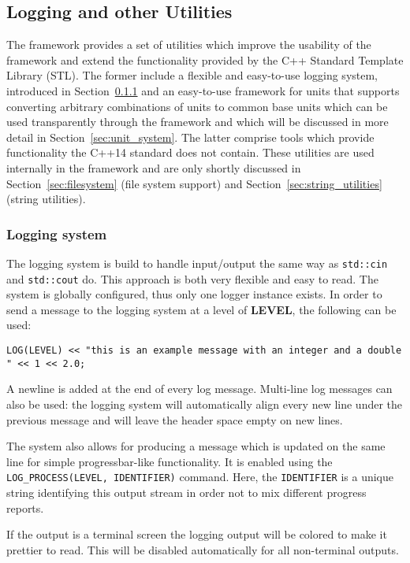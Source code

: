 \subsection{Logging and other Utilities}
\label{sec:logging_utilities}
The \apsq framework provides a set of utilities which improve the usability of the framework and extend the functionality provided by the C++ Standard Template Library (STL).
The former include a flexible and easy-to-use logging system, introduced in Section~\ref{sec:logger} and an easy-to-use framework for units that supports converting arbitrary combinations of units to common base units which can  be used transparently through the framework and which will be discussed in more detail in Section~\ref{sec:unit_system}.
The latter comprise tools which provide functionality the C++14 standard does not contain.
These utilities are used internally in the framework and are only shortly discussed in Section~\ref{sec:filesystem} (file system support) and Section~\ref{sec:string_utilities} (string utilities).

\subsubsection{Logging system}
\label{sec:logger}
The logging system is build to handle input/output the same way as \texttt{std::cin} and \texttt{std::cout} do.
This approach is both very flexible and easy to read.
The system is globally configured, thus only one logger instance exists.
In order to send a message to the logging system at a level of \textbf{LEVEL}, the following can be used:
\begin{verbatim}
LOG(LEVEL) << "this is an example message with an integer and a double " << 1 << 2.0;
\end{verbatim}
A newline is added at the end of every log message.
Multi-line log messages can also be used: the logging system will automatically align every new line under the previous message and will leave the header space empty on new lines.

The system also allows for producing a message which is updated on the same line for simple progressbar-like functionality.
It is enabled using the \texttt{LOG\_PROCESS(LEVEL, IDENTIFIER)} command.
Here, the \texttt{IDENTIFIER} is a unique string identifying this output stream in order not to mix different progress reports.

If the output is a terminal screen the logging output will be colored to make it prettier to read.
This will be disabled automatically for all non-terminal outputs.

